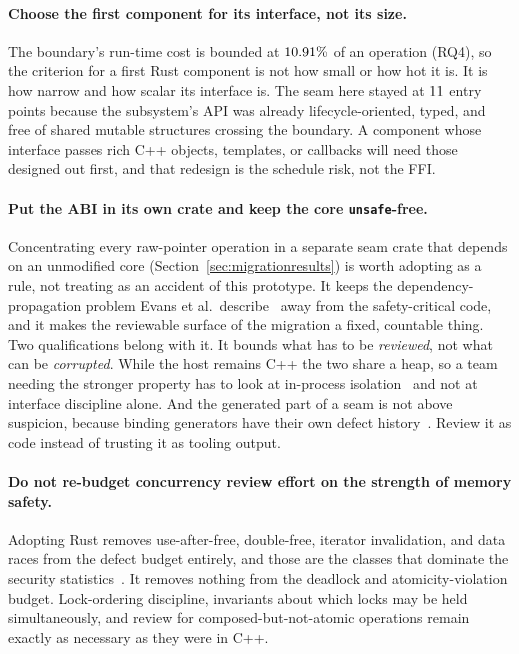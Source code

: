 \documentclass[english,oneside,a4paper,censored,csm,software-track-2020]{HYthesisML}
\begin{document}
\begin{appendices}
\paragraph{Choose the first component for its interface, not its size.}
The boundary's run-time cost is bounded at $10.91\%$ of an operation (RQ4), so the
criterion for a first Rust component is not how small or how hot it is. It is how narrow and
how scalar its interface is. The seam here stayed at $11$ entry points because the
subsystem's API was already lifecycle-oriented, typed, and free of shared mutable structures
crossing the boundary. A component whose interface passes rich C++ objects, templates, or
callbacks will need those designed out first, and that redesign is the schedule risk, not the
FFI.

\paragraph{Put the ABI in its own crate and keep the core \texttt{unsafe}-free.}
Concentrating every raw-pointer operation in a separate seam crate that depends on an unmodified
core (Section~\ref{sec:migrationresults}) is worth adopting as a rule, not treating as an
accident of this prototype. It keeps the dependency-propagation problem Evans et al.\
describe~\cite{evans2020rust} away from the safety-critical code, and it makes the reviewable
surface of the migration a fixed, countable thing. Two qualifications belong with it. It
bounds what has to be \emph{reviewed}, not what can be \emph{corrupted}. While the host remains
C++ the two share a heap, so a team needing the stronger property has to look at in-process
isolation~\cite{rivera2021galeed,kirth2022pkrusafe} and not at interface discipline alone. And
the generated part of a seam is not above suspicion, because binding generators have their own
defect history~\cite{cai2026interop}. Review it as code instead of trusting it as tooling output.

\paragraph{Do not re-budget concurrency review effort on the strength of memory safety.}
Adopting Rust removes use-after-free, double-free, iterator invalidation, and data races from
the defect budget entirely, and those are the classes that dominate the security
statistics~\cite{msrc2019memory,google2022android}. It removes nothing from the deadlock and
atomicity-violation budget. Lock-ordering discipline, invariants about which locks may be held
simultaneously, and review for composed-but-not-atomic operations remain exactly as necessary as
they were in C++.


\end{appendices}
\end{document}
